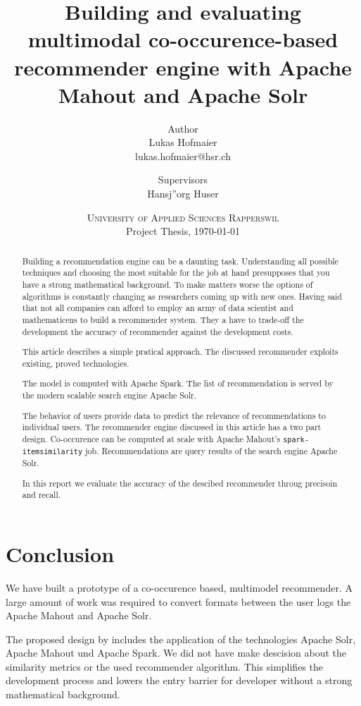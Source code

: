 \documentclass[twoside,a4paper]{article}
\title{ Building and evaluating multimodal co-occurence-based recommender engine with Apache Mahout and Apache Solr }
\author{
	Author \\
	Lukas Hofmaier \\
	lukas.hofmaier@hsr.ch
 	\and
	Supervisors \\
        Hansj''org Huser
}
\date{
	\textsc{University of Applied Sciences Rapperswil}\\
	Project Thesis,
	\today
}
\begin{document}
\maketitle
\tableofcontents

\begin{abstract}
Building a recommendation engine can be a daunting task. Understanding all possible techniques and choosing the most suitable for the job at hand presupposes that you have a strong mathematical background. To make matters worse the options of algorithms is constantly changing as researchers coming up with new ones. Having said that not all companies can afford to employ an army of data scientist and mathematicens to build a recommender system. They a have to trade-off the development the accuracy of recommender against the development costs. 

This article describes a simple pratical approach. The discussed recommender exploits existing, proved technologies. 

The model is computed with Apache Spark. The list of recommendation is served by the modern scalable search engine Apache Solr.

The behavior of users provide data to predict the relevance of recommendations to individual users. The recommender engine discussed in this article has a two part design.
Co-occurence can be computed at scale with Apache Mahout's \verb|spark-itemsimilarity| job.
Recommendations are query results of the search engine Apache Solr.

In this report we evaluate the accuracy of the descibed recommender throug precisoin and recall.
\end{abstract}





\section{Conclusion}
\label{sec:similarity}

We have built a prototype of a co-occurence based, multimodel recommender.
A large amount of work was required to convert formats between the user logs the Apache Mahout and Apache Solr.

The proposed design by \cite{Dunning14} includes the application of the technologies Apache Solr, Apache Mahout und Apache Spark. We did not have make descision about the similarity metrics or the used recommender algorithm. This simplifies the development process and lowers the entry barrier for developer without a strong mathematical background. 
\end{document}
